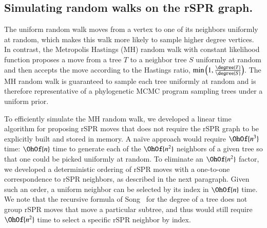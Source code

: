 \documentclass[]{elsarticle}
\begin{document}
\subsection{Simulating random walks on the rSPR graph.}
\label{sec:random_walks}
The uniform random walk moves from a vertex to one of its neighbors uniformly at random, which makes this walk more likely to sample higher degree vertices.
In contrast, the Metropolis Hastings (MH) random walk with constant likelihood function proposes a move from a tree $T$ to a neighbor tree $S$ uniformly at random and then accepts the move according to the Hastings ratio, $\min\left(1, \frac{\degree{T}}{\degree{S}}\right)$.
The MH random walk is guaranteed to sample each tree uniformly at random and is therefore representative of a phylogenetic MCMC program sampling trees under a uniform prior.

To efficiently simulate the MH random walk, we developed a linear time algorithm for proposing rSPR moves that does not require the rSPR graph to be explicitly built and stored in memory.
A na\"ive approach would require $\OhOf{n^3}$ time: $\OhOf{n}$ time to generate each of the $\OhOf{n^2}$ neighbors of a given tree so that one could be picked uniformly at random.
To eliminate an $\OhOf{n^2}$ factor, we developed a deterministic ordering of rSPR moves with a one-to-one correspondence to rSPR neighbors, as described in the next paragraph.
Given such an order, a uniform neighbor can be selected by its index in $\OhOf{n}$ time.
We note that the recursive formula of Song~\citep{Song2003-gf} for the degree of a tree does not group rSPR moves that move a particular subtree, and thus would still require $\OhOf{n^2}$ time to select a specific rSPR neighbor by index.
\end{document}
